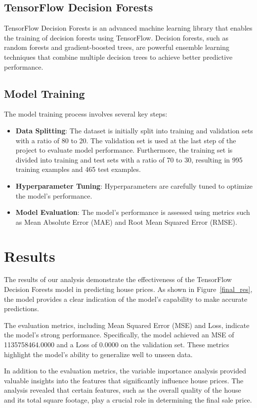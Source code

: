 \documentclass{article}
\begin{document}
\subsection{TensorFlow Decision Forests}
TensorFlow Decision Forests is an advanced machine learning library that enables the training of decision forests using TensorFlow. Decision forests, such as random forests and gradient-boosted trees, are powerful ensemble learning techniques that combine multiple decision trees to achieve better predictive performance.

\subsection{Model Training}
The model training process involves several key steps:
\begin{itemize}
    \item \textbf{Data Splitting}: The dataset is initially split into training and validation sets with a ratio of 80 to 20. The validation set is used at the last step of the project to evaluate model performance. Furthermore, the training set is divided into training and test sets with a ratio of 70 to 30, resulting in 995 training examples and 465 test examples.
    \item \textbf{Hyperparameter Tuning}: Hyperparameters are carefully tuned to optimize the model's performance.
    \item \textbf{Model Evaluation}: The model's performance is assessed using metrics such as Mean Absolute Error (MAE) and Root Mean Squared Error (RMSE).
\end{itemize}


\section{Results}

The results of our analysis demonstrate the effectiveness of the TensorFlow Decision Forests model in predicting house prices. As shown in Figure~\ref{final_res}, the model provides a clear indication of the model's capability to make accurate predictions.

The evaluation metrics, including Mean Squared Error (MSE) and Loss, indicate the model's strong performance. Specifically, the model achieved an MSE of 1135758464.0000 and a Loss of 0.0000 on the validation set. These metrics highlight the model's ability to generalize well to unseen data.

In addition to the evaluation metrics, the variable importance analysis provided valuable insights into the features that significantly influence house prices. The analysis revealed that certain features, such as the overall quality of the house and its total square footage, play a crucial role in determining the final sale price.
\end{document}
